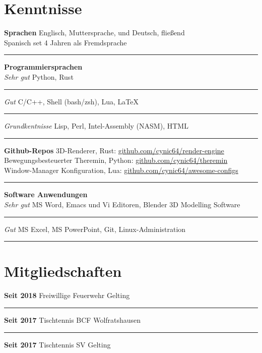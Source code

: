 \documentclass[12pt]{article}
\newcommand{\link}[1]{{\color{blue}\underline{#1}}}
\newcommand{\sect}[1]{
  {
    \vspace{6pt}
    \section*{
      \fontsize{18}{0}\selectfont
      \hspace{-12pt}
      \vspace{-12pt}
      #1
    }
  }
}
\newcommand{\sep}{{\color{gray}\vspace{-12pt}\hrule}}
\begin{document}
\pagebreak

\sect{Kenntnisse}
\textbf{Sprachen} \hfill{Englisch, Muttersprache, und Deutsch, flie{\ss}end} \\
\hspace*{\fill}Spanisch set 4 Jahren als Fremdsprache \\
\sep

\textbf{Programmiersprachen} \\
\textit{Sehr gut} \hfill{Python, Rust} \\
\sep
\textit{Gut} \hfill{C/C++, Shell (bash/zsh), Lua, \LaTeX} \\
\sep
\textit{Grundkentnisse} \hfill{Lisp, Perl, Intel-Assembly (NASM), HTML} \\
\sep

{
  \small
  \textbf{Github-Repos} \hfill{3D-Renderer, Rust: \link{github.com/cynic64/render-engine}} \\
  \hspace*{\fill} Bewegungsbesteuerter Theremin, Python: \link{github.com/cynic64/theremin} \\
  \hspace*{\fill} Window-Manager Konfiguration, Lua:
  \link{github.com/cynic64/awesome-configs} \\
}

\sep

\textbf{Software Anwendungen} \\
\textit{Sehr gut} \hfill{MS Word, Emacs und Vi Editoren, Blender 3D Modelling Software} \\
\sep
\textit{Gut} \hfill{MS Excel, MS PowerPoint, Git, Linux-Administration} \\
\sep

\sect{Mitgliedschaften}

\textbf{Seit 2018} \hfill{Freiwillige Feuerwehr Gelting} \\
\sep
\textbf{Seit 2017} \hfill{Tischtennis BCF Wolfratshausen} \\
\sep
\textbf{Seit 2017} \hfill{Tischtennis SV Gelting}
\end{document}
